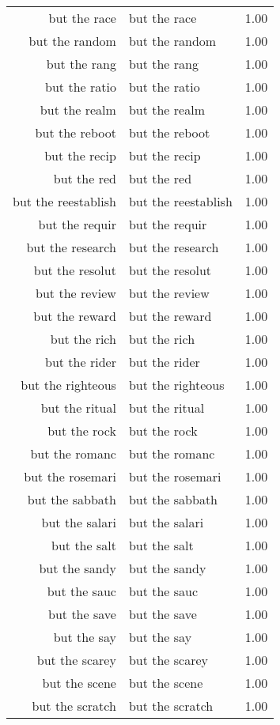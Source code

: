 \begin{table}[ht]
\begin{tabular}{rlr}
  but the race & but the race & 1.00 \\ 
  but the random & but the random & 1.00 \\ 
  but the rang & but the rang & 1.00 \\ 
  but the ratio & but the ratio & 1.00 \\ 
  but the realm & but the realm & 1.00 \\ 
  but the reboot & but the reboot & 1.00 \\ 
  but the recip & but the recip & 1.00 \\ 
  but the red & but the red & 1.00 \\ 
  but the reestablish & but the reestablish & 1.00 \\ 
  but the requir & but the requir & 1.00 \\ 
  but the research & but the research & 1.00 \\ 
  but the resolut & but the resolut & 1.00 \\ 
  but the review & but the review & 1.00 \\ 
  but the reward & but the reward & 1.00 \\ 
  but the rich & but the rich & 1.00 \\ 
  but the rider & but the rider & 1.00 \\ 
  but the righteous & but the righteous & 1.00 \\ 
  but the ritual & but the ritual & 1.00 \\ 
  but the rock & but the rock & 1.00 \\ 
  but the romanc & but the romanc & 1.00 \\ 
  but the rosemari & but the rosemari & 1.00 \\ 
  but the sabbath & but the sabbath & 1.00 \\ 
  but the salari & but the salari & 1.00 \\ 
  but the salt & but the salt & 1.00 \\ 
  but the sandy & but the sandy & 1.00 \\ 
  but the sauc & but the sauc & 1.00 \\ 
  but the save & but the save & 1.00 \\ 
  but the say & but the say & 1.00 \\ 
  but the scarey & but the scarey & 1.00 \\ 
  but the scene & but the scene & 1.00 \\ 
  but the scratch & but the scratch & 1.00 \\ 

\end{tabular}
\end{table}

